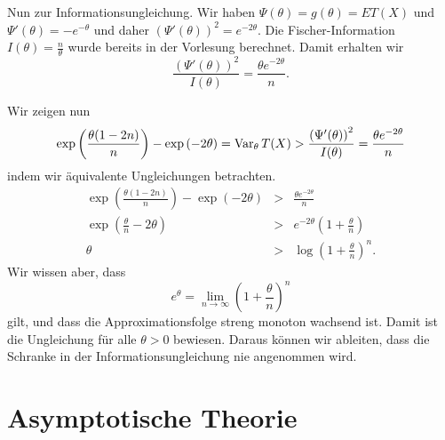 Nun zur Informationsungleichung. Wir haben $\Psi(\theta)=g(\theta)=E T(X)$ und 
$\Psi'(\theta)=-e^{-\theta}$ und daher 
$\left( \Psi'(\theta) \right)^2 = e^{-2\theta}$. Die Fischer-Information 
$I(\theta)=\frac{n}{\theta}$ wurde bereits in der Vorlesung berechnet. Damit erhalten wir 
\begin{equation*}
    \frac{\left( \Psi'(\theta) \right)^2}{I(\theta)} = \frac{\theta e^{-2 \theta} }{n}.
\end{equation*}

Wir zeigen nun
\begin{equation*}
    \exp\left( \frac{\theta(1-2n)}{n} \right) - \exp\left( -2\theta \right) = \operatorname{Var}_\theta T(X)
    > \frac{\left( \Psi'(\theta) \right)^2}{I(\theta)} = \frac{\theta e^{-2 \theta} }{n}
\end{equation*}
indem wir äquivalente Ungleichungen betrachten.
\begin{eqnarray*}
    \exp\left( \frac{\theta(1-2n)}{n} \right) - \exp\left( -2\theta \right) 
    &>& \frac{\theta e^{-2 \theta} }{n} \\
    \exp\left( \frac{\theta}{n} -2\theta \right) &>& e^{-2\theta} \left( 1+\frac{\theta}{n} \right) \\
    \theta &>& \log \left( 1+\frac{\theta}{n} \right)^n.
\end{eqnarray*}
Wir wissen aber, dass
\begin{equation*}
    e^\theta = \lim_{n\to\infty} \left( 1+\frac{\theta}{n} \right)^n
\end{equation*}
gilt, und dass die Approximationsfolge streng monoton wachsend ist. Damit ist die Ungleichung
für alle $\theta>0$ bewiesen. Daraus können wir ableiten, dass die Schranke in der 
Informationsungleichung nie angenommen wird.






\section{Asymptotische Theorie}

